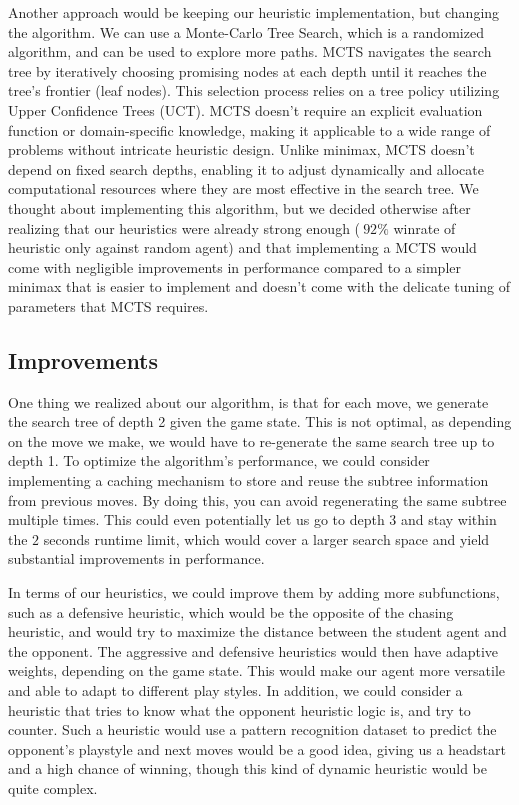 \documentclass[11pt]{article}
\begin{document}
Another approach would be keeping our heuristic implementation, but changing the algorithm. We can use a Monte-Carlo Tree Search, which is a randomized algorithm, and can be used to explore more paths.
MCTS navigates the search tree by iteratively choosing promising nodes at each depth until it reaches the tree's frontier (leaf nodes). This selection process relies on a tree policy utilizing Upper Confidence Trees (UCT).
MCTS doesn't require an explicit evaluation function or domain-specific knowledge, making it applicable to a wide range of problems without intricate heuristic design. Unlike minimax, MCTS doesn't depend 
on fixed search depths, enabling it to adjust dynamically and allocate computational resources where they are most effective in the search tree. We thought about implementing this algorithm, but we decided otherwise
after realizing that our heuristics were already strong enough ($~92\%$ winrate of heuristic only against random agent) and that implementing a MCTS would come with negligible improvements in performance compared to a simpler
minimax that is easier to implement and doesn't come with the delicate tuning of parameters that MCTS requires.

\subsection{Improvements}

One thing we realized about our algorithm, is that for each move, we generate the search tree of depth 2 given the game state. This is not optimal, as depending on the move we make, we would have to re-generate the same search tree up to depth 1.
To optimize the algorithm's performance, we could consider implementing a caching mechanism to store and reuse the subtree information from previous moves. By doing this, you can avoid regenerating the same subtree multiple times.
This could even potentially let us go to depth 3 and stay within the $2$ seconds runtime limit, which would cover a larger search space and yield substantial improvements in performance.

In terms of our heuristics, we could improve them by adding more subfunctions, such as a defensive heuristic, which would be the opposite of the chasing heuristic, and would try to maximize the distance between the student agent and the opponent. The aggressive and defensive heuristics
would then have adaptive weights, depending on the game state. This would make our agent more versatile and able to adapt to different play styles. 
In addition, we could consider a heuristic that tries to know what the opponent heuristic logic is, and try to counter. Such a heuristic would use 
a pattern recognition dataset to predict the opponent's playstyle and next moves would be a good idea, giving us a headstart and a high chance of winning, though this kind of dynamic heuristic would be quite complex.
\end{document}
